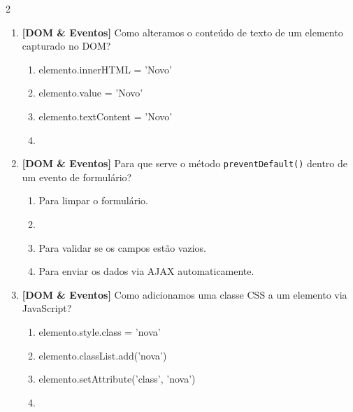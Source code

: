 \documentclass[a4paper,10pt]{article}
\begin{document}
\begin{multicols*}{2}
\begin{enumerate}[label=\textbf{\arabic*.}, resume, leftmargin=*]
\item \textbf{[DOM \& Eventos]} Como alteramos o conteúdo de texto de um elemento capturado no DOM?
\begin{enumerate}[label=(\alph*), noitemsep]
  \item elemento.innerHTML = 'Novo'
  \item elemento.value = 'Novo'
  \item elemento.textContent = 'Novo'
  \item {}
\end{enumerate}

\item \textbf{[DOM \& Eventos]} Para que serve o método \texttt{preventDefault()} dentro de um evento de formulário?
\begin{enumerate}[label=(\alph*), noitemsep]
  \item Para limpar o formulário.
  \item {}
  \item Para validar se os campos estão vazios.
  \item Para enviar os dados via AJAX automaticamente.
\end{enumerate}

\item \textbf{[DOM \& Eventos]} Como adicionamos uma classe CSS a um elemento via JavaScript?
\begin{enumerate}[label=(\alph*), noitemsep]
  \item elemento.style.class = 'nova'
  \item elemento.classList.add('nova')
  \item elemento.setAttribute('class', 'nova')
  \item {}
\end{enumerate}

\end{enumerate}
\end{multicols*}
\newpage
\end{document}
